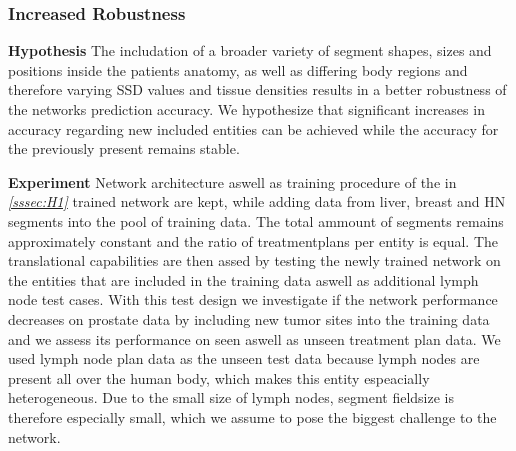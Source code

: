 \subsubsection{Increased Robustness}\label{sssec:H3}
\begin{hanginglist}\itemsep2pt

    \item\textbf{Hypothesis}\newline
    The includation of a broader variety of segment shapes, sizes and positions inside the patients anatomy, as well as differing body regions and therefore varying \acs{SSD} values and tissue densities results in a better robustness of the networks prediction accuracy.
    We hypothesize that significant increases in accuracy regarding new included entities can be achieved while the accuracy for the previously present remains stable.\\

    \item\textbf{Experiment}\newline
    Network architecture aswell as training procedure of the in \emph{\ref{sssec:H1} } trained network are kept, while adding data from liver, breast and \acs{HN} segments into the pool of training data. The total ammount of segments remains approximately constant and the ratio of treatmentplans per entity is equal.
    The translational capabilities are then assed by testing the newly trained network on the entities that are included in the training data aswell as additional lymph node test cases. 
    With this test design we investigate if the network performance decreases on prostate data by including new tumor sites into the training data and we assess its performance on seen aswell as unseen treatment plan data.
    We used lymph node plan data as the unseen test data because lymph nodes are present all over the human body, which makes this entity espeacially heterogeneous. 
    Due to the small size of lymph nodes, segment fieldsize is therefore especially small, which we assume to pose the biggest challenge to the network.\\

\end{hanginglist}

